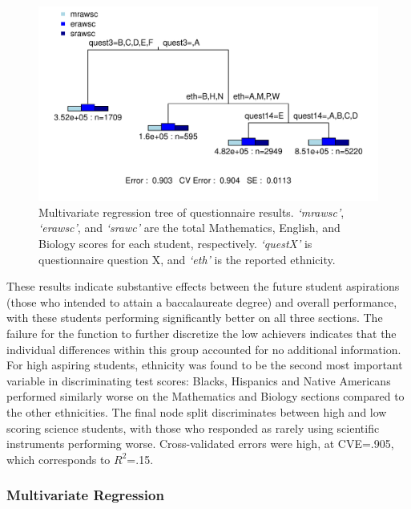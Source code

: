 \documentclass{article}\usepackage[]{graphicx}\usepackage[]{color}
\makeatletter
\def\maxwidth{ %
  \ifdim\Gin@nat@width>\linewidth
    \linewidth
  \else
    \Gin@nat@width
  \fi
}
\newenvironment{knitrout}{}{} %
\makeatother
\begin{document}
\begin{figure}[h]
\begin{knitrout}
\color{fgcolor}
\includegraphics[width=\maxwidth]{figure/unnamed-chunk-13} 

\end{knitrout}

\caption{Multivariate regression tree of questionnaire results. \emph{`mrawsc'}, \emph{`erawsc'}, and \emph{`srawc'} are the total Mathematics, English, and Biology scores for each student, respectively. \emph{`questX'} is questionnaire question X, and \emph{`eth'} is the reported ethnicity. }
\end{figure}

These results indicate substantive effects between the future student aspirations (those who intended to attain a baccalaureate degree) and overall performance, with these students performing significantly better on all three sections. The failure for the function to further discretize the low achievers indicates that the individual differences within this group accounted for no additional information. For high aspiring students, ethnicity was found to be the second most important variable in discriminating test scores: Blacks, Hispanics and Native Americans performed similarly worse on the Mathematics and Biology sections compared to the other ethnicities. The final node split discriminates between high and low scoring science students, with those who responded as rarely using scientific instruments performing worse. Cross-validated errors were high, at CVE=.905, which corresponds to $R^2$=.15.

\subsubsection{Multivariate Regression}
\end{document}

